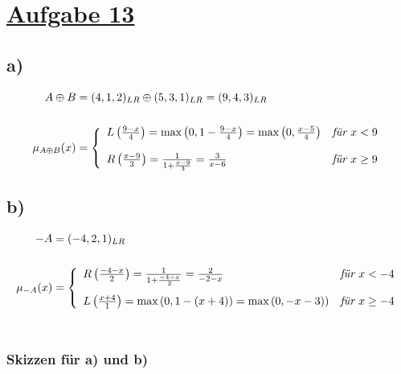 \section*{\underline{Aufgabe 13}}

\subsection*{a)}

  \begin{align*}
    A \oplus B &= (4,1,2)_{LR} \oplus (5,3,1)_{LR} = (9,4,3)_{LR}\\\\
    \mu_{A \oplus B}(x) &= \left\{
    \begin{array}{ll}
      L\left(\frac{9 - x}{4}\right) = \text{max}\left(0, 1 - \frac{9 - x}{4}\right) = \text{max}\left(0, \frac{x - 5}{4}\right)	& \textit{für } x < 9 \\[\bigskipamount]
      R\left(\frac{x - 9}{3}\right) = \frac{1}{1 + \frac{x - 9}{3}} = \frac{3}{x - 6}	& \textit{für } x \geq 9 \\
    \end{array}
    \right.
  \end{align*}
  
\subsection*{b)}

  \begin{align*}
    -A &= (-4,2,1)_{LR}\\\\
    \mu_{-A}(x) &= \left\{
    \begin{array}{ll}
      R\left(\frac{-4 -x}{2}\right) = \frac{1}{1 + \frac{-4 -x}{2}} = \frac{2}{-2-x}	& \textit{für } x < -4 \\[\bigskipamount]
      L\left(\frac{x + 4}{1}\right) = \text{max}\left(0, 1 - (x + 4)\right) = \text{max}\left(0,-x-3)\right)	& \textit{für } x \geq -4 \\
    \end{array}
    \right.
  \end{align*}\\
  
\subsubsection*{Skizzen für a) und b)}

\leavevmode\\

